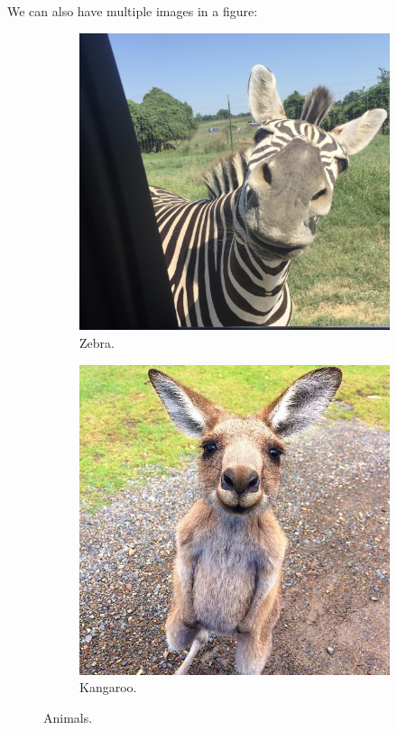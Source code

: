 \documentclass[12pt]{scrarticle}
\begin{document}
We can also have multiple images in a figure:

\begin{figure}[H]
    \centering
    \begin{subfigure}{0.49\textwidth}
        \includegraphics[width=0.9\linewidth]{Running-Example/zebra.jpeg}
        \caption{Zebra.}
    \end{subfigure}
    \begin{subfigure}{0.49\textwidth}
        \includegraphics[width=0.9\linewidth]{Running-Example/kangaroo.jpeg}
        \caption{Kangaroo.}
    \end{subfigure}
    \caption{Animals.}
    \label{fig:animals}
\end{figure}
\end{document}
